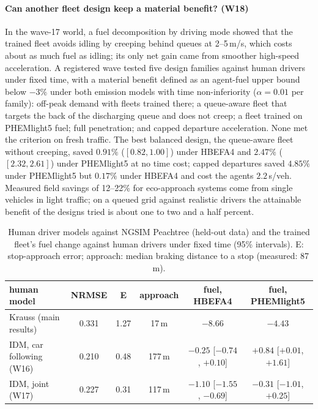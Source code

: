 \paragraph{Can another fleet design keep a material benefit? (W18)} In the wave-17 world, a fuel decomposition by driving mode showed that the
trained fleet avoids idling by creeping behind queues at 2--5\,m/s, which costs about as much fuel as idling; its only net gain came from
smoother high-speed acceleration. A registered wave tested five design families against human drivers under fixed time, with a material
benefit defined as an agent-fuel upper bound below $-3\%$ under both emission models with time non-inferiority ($\alpha=0.01$ per family):
off-peak demand with fleets trained there; a queue-aware fleet that targets the back of the discharging queue and does not creep; a fleet
trained on PHEMlight5 fuel; full penetration; and capped departure acceleration. None met the criterion on fresh traffic. The best balanced
design, the queue-aware fleet without creeping, saved $0.91\%$ ($[0.82, 1.00]$) under HBEFA4 and $2.47\%$ ($[2.32, 2.61]$) under PHEMlight5 at
no time cost; capped departures saved $4.85\%$ under PHEMlight5 but $0.17\%$ under HBEFA4 and cost the agents $2.2$\,s/veh. Measured field
savings of 12--22\% for eco-approach systems come from single vehicles in light traffic; on a queued grid against realistic drivers the
attainable benefit of the designs tried is about one to two and a half percent.
\begin{table}[t]\centering\scriptsize\setlength{\tabcolsep}{4pt}
\caption{Human driver models against NGSIM Peachtree (held-out data) and the trained fleet's fuel change against human drivers under fixed
time (95\% intervals). E: stop-approach error; approach: median braking distance to a stop (measured: 87\,m).}\label{tab:human}
\begin{tabular}{@{}lccccc@{}}\toprule
human model & NRMSE & E & approach & fuel, HBEFA4 & fuel, PHEMlight5\\\midrule
Krauss (main results) & 0.331 & 1.27 & 17\,m & $-8.66$ & $-4.43$\\
IDM, car following (W16) & 0.210 & 0.48 & 177\,m & $-0.25$ [$-0.74$, $+0.10$] & $+0.84$ [$+0.01$, $+1.61$]\\
IDM, joint (W17) & 0.227 & 0.31 & 117\,m & $-1.10$ [$-1.55$, $-0.69$] & $-0.31$ [$-1.01$, $+0.25$]\\\bottomrule
\end{tabular}\end{table}

